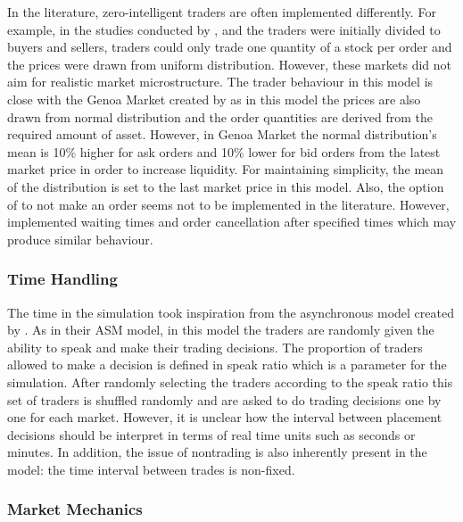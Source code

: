 In the literature, zero-intelligent traders are often implemented differently. For example, in the studies conducted by 
\citet{God93}, \citet{Jam96} and \citet{Mil08} the traders were initially divided to buyers and
sellers, traders could only trade one quantity of a stock per order and the prices
were drawn from uniform distribution. However, these markets did not aim for
realistic market microstructure. The trader behaviour in this model is close with the Genoa Market
created by \citet{Genoa01} as in this model the prices are also drawn from normal distribution and
the order quantities are derived from the required amount of asset. However, in Genoa Market the
normal distribution's mean is 10\% higher for ask orders and 10\% lower for bid orders from the
latest market price in order to increase liquidity. For maintaining simplicity, the mean of the distribution
is set to the last market price in this model. Also, the option of to not make an order seems not to be
implemented in the literature. However, \citet{Raberto05} implemented waiting times and order cancellation
after specified times which may produce similar behaviour. 

\subsubsection{Time Handling}

The time in the simulation took inspiration from the asynchronous model created by \citet{Julien07}. 
As in their ASM model, in this model the traders are randomly given the ability to speak and make 
their trading decisions. The proportion of traders allowed to make a decision is defined in
speak ratio which is a parameter for the simulation. After randomly selecting the traders
according to the speak ratio this set of traders is shuffled randomly and are asked to do trading 
decisions one by one for each market. However, it is unclear how the interval between placement 
decisions should be interpret in terms of real time units such as seconds or minutes. In addition, 
the issue of nontrading is also inherently present in the model: the time interval between trades 
is non-fixed.

\subsubsection{Market Mechanics}


